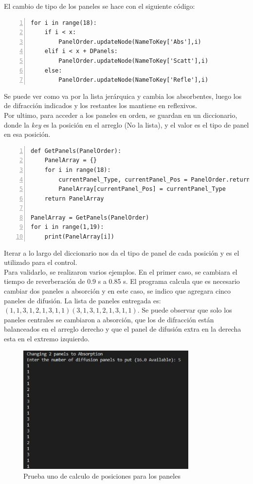El cambio de tipo de los paneles se hace con el siguiente código:
\begin{lstlisting}[frame=single,numbers=left, style=matlab-editor, basicstyle=\tiny]
for i in range(18):
    if i < x:
        PanelOrder.updateNode(NameToKey['Abs'],i)
    elif i < x + DPanels:
        PanelOrder.updateNode(NameToKey['Scatt'],i) 
    else:
        PanelOrder.updateNode(NameToKey['Refle'],i) 
\end{lstlisting}
Se puede ver como va por la lista jerárquica y cambia los absorbentes, luego los de difracción indicados y los restantes los mantiene en reflexivos. \\
Por ultimo, para acceder a los paneles en orden, se guardan en un diccionario, donde la \textit{key} es la posición en el arreglo (No la lista), y el valor es el tipo de panel en esa posición.
\begin{lstlisting}[frame=single,numbers=left, style=matlab-editor, basicstyle=\tiny]
def GetPanels(PanelOrder):
    PanelArray = {}
    for i in range(18):
        currentPanel_Type, currentPanel_Pos = PanelOrder.returnAtIndex(i)
        PanelArray[currentPanel_Pos] = currentPanel_Type
    return PanelArray

PanelArray = GetPanels(PanelOrder)
for i in range(1,19):
    print(PanelArray[i])
\end{lstlisting}
Iterar a lo largo del diccionario nos da el tipo de panel de cada posición y es el utilizado para el control. \\
Para validarlo, se realizaron varios ejemplos. En el primer caso, se cambiara el tiempo de reverberación de 0.9 s a 0.85 s. El programa calcula que es necesario cambiar dos paneles a absorción y en este caso, se indico que agregara cinco paneles de difusión. La lista de paneles entregada es: $(1,1,3,1,2,1,3,1,1) (3,1,3,1,2,1,3,1,1)$. Se puede observar que solo los paneles centrales se cambiaron a absorción, que los de difracción están balanceados en el arreglo derecho y que el panel de difusión extra en la derecha esta en el extremo izquierdo. \\
\begin{figure}[!htb]
    \centering
    \includegraphics[width=0.8\textwidth]{imagenes/PanelsExample1.jpg}
    \caption{Prueba uno de calculo de posiciones para los paneles}
    \label{fig:PanelsExample1}
\end{figure}
